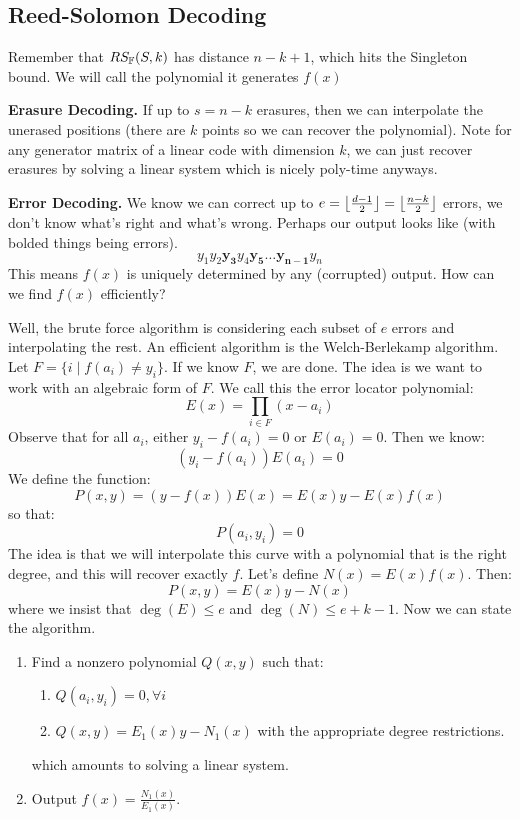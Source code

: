 \subsection{Reed-Solomon Decoding}
Remember that $RS_{\operatorname{\mathbb{F}}}(S, k)$ has distance $n - k + 1$, which hits the Singleton bound. We will call the polynomial it generates $f(x)$

\textbf{Erasure Decoding.} If up to $s = n - k$ erasures, then we can interpolate the unerased positions (there are $k$ points so we can recover the polynomial). Note for any generator matrix of a linear code with dimension $k$,
we can just recover erasures by solving a linear system which is nicely poly-time anyways.

\textbf{Error Decoding.} We know we can correct up to $e = \left\lfloor \frac{d - 1}{2} \right\rfloor = \left\lfloor \frac{n - k}{2} \right\rfloor$ errors, we don't know what's right and what's wrong. Perhaps our output looks like (with bolded things being errors).
\[ y_1 y_2 \mathbf{y_3} y_4 \mathbf{y_5} \dots \mathbf{y_{n - 1}} y_n \]
This means $f(x)$ is uniquely determined by any (corrupted) output. How can we find $f(x)$ efficiently?

Well, the brute force algorithm is considering each subset of $e$ errors and interpolating the rest. An efficient algorithm is
the Welch-Berlekamp algorithm. Let $F = \{i \mid f(a_i) \neq y_i\}$. If we know $F$, we are done.
The idea is we want to work with an algebraic form of $F$. We call this the error locator polynomial:
\[ E(x) = \prod_{i \in F} (x - a_i) \]
Observe that for all $a_i$, either $y_i - f(a_i) = 0$ or $E(a_i) = 0$.
Then we know:
\[ (y_i - f(a_i)) E(a_i) = 0 \]
We define the function:
\[ P(x, y) = (y - f(x)) E(x) = E(x) y - E(x) f(x) \]
so that:
\[ P(a_i, y_i) = 0 \]
The idea is that we will interpolate this curve with a polynomial that is the right degree,
and this will recover exactly $f$. Let's define $N(x) = E(x) f(x)$. Then:
\[ P(x, y) = E(x)y - N(x) \]
where we insist that $\deg(E) \leq e$ and $\deg(N) \leq e + k - 1$. Now we can state the algorithm.

\begin{enumerate}
    \item Find a nonzero polynomial $Q(x, y)$ such that:
    \begin{enumerate}
        \item $Q(a_i, y_i) = 0, \forall i$
        \item $Q(x, y) = E_1(x) y - N_1(x)$ with the appropriate degree restrictions.
    \end{enumerate} 
    which amounts to solving a linear system.
    \item Output $f(x) = \frac{N_1(x)}{E_1(x)}$.
\end{enumerate}


